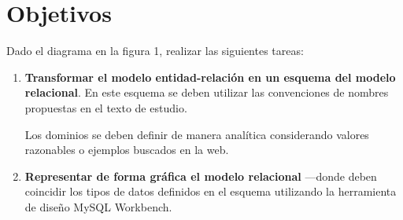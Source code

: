 \chapter{Objetivos}

Dado el diagrama en la figura 1, realizar las siguientes tareas:
\begin{enumerate}
    \item \textbf{Transformar el modelo entidad-relación en un esquema del modelo relacional}. En este esquema se deben utilizar las convenciones de nombres propuestas en el texto de estudio.
    
    Los dominios se deben definir de manera analítica considerando valores razonables o ejemplos buscados en la web.
    \item \textbf{Representar de forma gráfica el modelo relacional} —donde deben coincidir los tipos de datos definidos en el esquema utilizando la herramienta de diseño MySQL Workbench.
\end{enumerate}